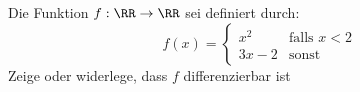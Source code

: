 Die Funktion \(f:\RR\to\RR\) sei definiert durch:
\[
    f(x)=\begin{cases}
        x^2 & \text{falls }x<2 \\
        3x-2 & \text{sonst}
    \end{cases}
\]
Zeige oder widerlege, dass $f$ differenzierbar ist
\begin{solution}
    
\end{solution}